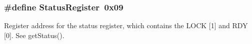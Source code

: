 \hypertarget{group___device_addrs_gacda516aca361386a87975a62eba267d7}{
\subsubsection[{Status\+Register}]{\setlength{\rightskip}{0pt plus 5cm}\#define Status\+Register~0x09}}\label{group___device_addrs_gacda516aca361386a87975a62eba267d7}
Register address for the status register, which contains the {\ttfamily L\+O\+C\+K} \mbox{[}1\mbox{]} and {\ttfamily R\+D\+Y} \mbox{[}0\mbox{]}. See {\ttfamily get\+Status()}. 